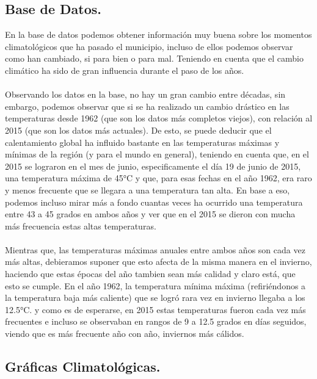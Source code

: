 \documentclass{article}
\begin{document}
\subsection{Base de Datos.} 
En la base de datos podemos obtener información muy buena sobre los momentos climatológicos que ha pasado el municipio, incluso de ellos podemos observar como han cambiado, si para bien o para mal. Teniendo en cuenta que el cambio climático ha sido de gran influencia durante el paso de los años.\\\\Observando los datos en la base, no hay un gran cambio entre décadas, sin embargo, podemos observar que si se ha realizado un cambio drástico en las temperaturas desde 1962 (que son los datos más completos viejos), con relación al 2015 (que son los datos más actuales). De esto, se puede deducir que el calentamiento global ha influido bastante en las temperaturas máximas y mínimas de la región (y para el mundo en general), teniendo en cuenta que, en el 2015 se lograron en el mes de junio, especificamente el día 19 de junio de 2015, una temperatura máxima de 45°C y que, para esas fechas en el año 1962, era raro y menos frecuente que se llegara a una temperatura tan alta. En base a eso, podemos incluso mirar más a fondo cuantas veces ha ocurrido una temperatura entre 43 a 45 grados en ambos años y ver que en el 2015 se dieron con mucha más frecuencia estas altas temperaturas. \\\\Mientras que, las temperaturas máximas anuales entre ambos años son cada vez más altas, debieramos suponer que esto afecta de la misma manera en el invierno, haciendo que estas épocas del año tambien sean más calidad y claro está, que esto se cumple. En el año 1962, la temperatura mínima máxima (refiriéndonos a la temperatura baja más caliente) que se logró rara vez en invierno llegaba a los 12.5°C. y como es de esperarse, en 2015 estas temperaturas fueron cada vez más frecuentes e incluso se observaban en rangos de 9 a 12.5 grados en días seguidos, viendo que es más frecuente año con año, inviernos más cálidos.
\subsection{Gráficas Climatológicas.} \\
\end{document}
